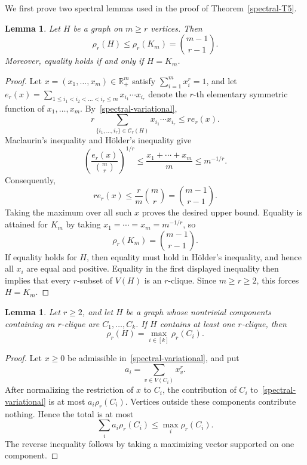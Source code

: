 \documentclass[11pt,a4paper]{article}
\newtheorem{lemma}[theorem]{Lemma}
\begin{document}
We first prove two spectral lemmas used in the proof of Theorem~\ref{spectral-T5}.

\begin{lemma}\label{complete-spectral-bound}
Let $H$ be a graph on $m\ge r$ vertices. Then
\[
\rho_r(H)\le \rho_r(K_m)=\binom{m-1}{r-1}.
\]
Moreover, equality holds if and only if $H=K_m$.
\end{lemma}

\begin{proof}
Let $x=(x_1,\ldots,x_m)\in\mathbb R_+^m$ satisfy $\sum_{i=1}^m x_i^r=1$, and let $e_r(x)=\sum_{1\le i_1<i_2<\ldots <i_r\le m}x_{i_1}\cdots x_{i_r}$
denote the $r$-th elementary symmetric function of $x_1,\ldots,x_m$. By~\eqref{spectral-variational},
\[
r\sum_{\{i_1,\ldots,i_r\}\in\mathcal C_r(H)}x_{i_1}\cdots x_{i_r}
\le r e_r(x).
\]
Maclaurin's inequality and H\"older's inequality give
\[
\left(\frac{e_r(x)}{\binom mr}\right)^{1/r}
\le \frac{x_1+\cdots+x_m}{m}
\le m^{-1/r}.
\]
Consequently,
\[
r e_r(x)\le \frac{r}{m}\binom mr=\binom{m-1}{r-1}.
\]
Taking the maximum over all such $x$ proves the desired upper bound. Equality is attained for $K_m$ by taking $x_1=\cdots=x_m=m^{-1/r}$, so
\[
\rho_r(K_m)=\binom{m-1}{r-1}.
\]
If equality holds for $H$, then equality must hold in H\"older's inequality, and hence all $x_i$ are equal and positive. Equality in the first displayed inequality then implies that every $r$-subset of $V(H)$ is an $r$-clique. Since $m\ge r\ge2$, this forces $H=K_m$.
\end{proof}

\begin{lemma}\label{spectral-component-max}
Let $r\ge2$, and let $H$ be a graph whose nontrivial components containing an $r$-clique are $C_1,\ldots,C_k$. If $H$ contains at least one $r$-clique, then
\[
\rho_r(H)=\max_{i\in[k]}\rho_r(C_i).
\]
\end{lemma}

\begin{proof}
Let $x\ge0$ be admissible in~\eqref{spectral-variational}, and put
\[
a_i=\sum_{v\in V(C_i)}x_v^r.
\]
After normalizing the restriction of $x$ to $C_i$, the contribution of $C_i$ to~\eqref{spectral-variational} is at most $a_i\rho_r(C_i)$. Vertices outside these components contribute nothing. Hence the total is at most
\[
\sum_i a_i\rho_r(C_i)\le \max_i\rho_r(C_i).
\]
The reverse inequality follows by taking a maximizing vector supported on one component.
\end{proof}
\end{document}
